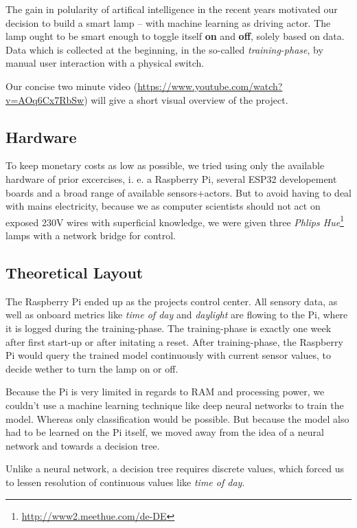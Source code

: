 

The gain in polularity of artifical intelligence in the recent years motivated our decision to build a smart lamp -- with machine learning as driving actor. The lamp ought to be smart enough to toggle itself \textbf{on} and \textbf{off}, solely based on data. Data which is collected at the beginning, in the so-called \emph{training-phase}, by manual user interaction with a physical switch.

Our concise two minute video (\url{https://www.youtube.com/watch?v=AOq6Cx7RbSw}) will give a short visual overview of the project.


\subsection{Hardware}

To keep monetary costs as low as possible, we tried using only the available hardware of prior excercises, i. e. a Raspberry Pi, several ESP32 developement boards and a broad range of available sensors+actors. But to avoid having to deal with mains electricity, because we as computer scientists should not act on exposed 230V wires with superficial knowledge, we were given three \emph{Phlips Hue}\footnote{\url{http://www2.meethue.com/de-DE}} lamps with a network bridge for control.

\subsection{Theoretical Layout}

The Raspberry Pi ended up as the projects control center. All sensory data, as well as onboard metrics like \emph{time of day} and \emph{daylight} are flowing to the Pi, where it is logged during the training-phase. The training-phase is exactly one week after first start-up or after initating a reset. After training-phase, the Raspberry Pi would query the trained model continuously with current sensor values, to decide wether to turn the lamp on or off.

Because the Pi is very limited in regards to RAM and processing power, we couldn't use a machine learning technique like deep neural networks to train the model. Whereas only classification would be possible. But because the model also had to be learned on the Pi itself, we moved away from the idea of a neural network and towards a decision tree.

Unlike a neural network, a decision tree requires discrete values, which forced us to lessen resolution of continuous values like \emph{time of day}. 

